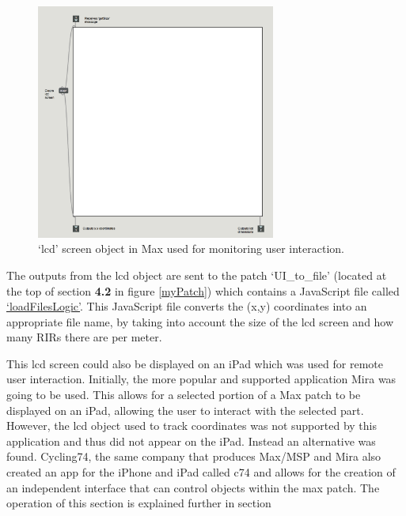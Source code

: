 \documentclass[../../main.tex]{subfiles}
\begin{document}
			\begin{figure}[p]
				\centerline{\includegraphics[width=0.7\textwidth]{Sections/Implementation/Max/images/Max/lcd.png}}
				\caption{`lcd' screen object in Max used for monitoring user interaction.}
				\label{lcd}
			\end{figure}

			The outputs from the lcd object are sent to the patch ‘UI\_to\_file’ (located at the top of section \textbf{4.2} in figure \ref{myPatch}) which contains a JavaScript file called \href{http://lt669.github.io/code/javascript/html/loadFilesLogic.html}{‘loadFilesLogic’}. This JavaScript file converts the (x,y) coordinates into an appropriate file name, by taking into account the size of the lcd screen and how many RIRs there are per meter.

			This lcd screen could also be displayed on an iPad which was used for remote user interaction. Initially, the more popular and supported application Mira \cite{mira} was going to be used. This allows for a selected portion of a Max patch to be displayed on an iPad, allowing the user to interact with the selected part. However, the lcd object used to track coordinates was not supported by this application and thus did not appear on the iPad. Instead an alternative was found. Cycling74, the same company that produces Max/MSP and Mira also created an app for the iPhone and iPad called c74 \cite{c74} and allows for the creation of an independent interface that can control objects within the max patch. The operation of this section is explained further in section 
\end{document}
